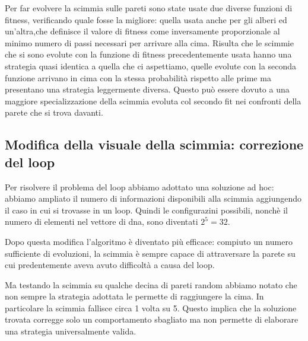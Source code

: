\documentclass{article}
\begin{document}
Per far evolvere la scimmia sulle pareti sono state usate due diverse funzioni di fitness, verificando quale fosse la migliore: quella usata anche per gli alberi ed un'altra,che definisce il valore di fitness come inversamente proporzionale al minimo numero di passi necessari per arrivare alla cima. Risulta che le scimmie che si sono evolute con la funzione di fitness precedentemente usata hanno una strategia quasi identica a quella che ci aspettiamo, quelle evolute con la seconda funzione arrivano in cima con la stessa probabilit\`{a} rispetto alle prime ma presentano una strategia leggermente diversa. Questo pu\`{o} essere dovuto a una maggiore specializzazione della scimmia evoluta col secondo fit nei confronti della parete che si trova davanti.

\subsection{Modifica della visuale della scimmia: correzione del loop}
Per risolvere il problema del loop abbiamo adottato una soluzione ad hoc: abbiamo ampliato il numero di informazioni disponibili alla scimmia aggiungendo il caso in cui si trovasse in un loop.
Quindi le configurazini possibili, nonch\`{e} il numero di elementi nel vettore di dna, sono diventati $2^5=32$. 

Dopo questa modifica l'algoritmo \`{e} diventato pi\`{u} efficace: compiuto un numero sufficiente di evoluzioni, la scimmia \`{e} sempre capace di attraversare la parete su cui predentemente aveva avuto difficolt\`{a} a causa del loop.

Ma testando la scimmia su qualche decina di pareti random  abbiamo notato che non sempre la strategia adottata le permette di raggiungere la cima. In particolare la scimmia fallisce circa 1 volta su 5. Questo implica che la soluzione trovata corregge solo un comportamento sbagliato ma non permette di elaborare una strategia universalmente valida.
\end{document}
